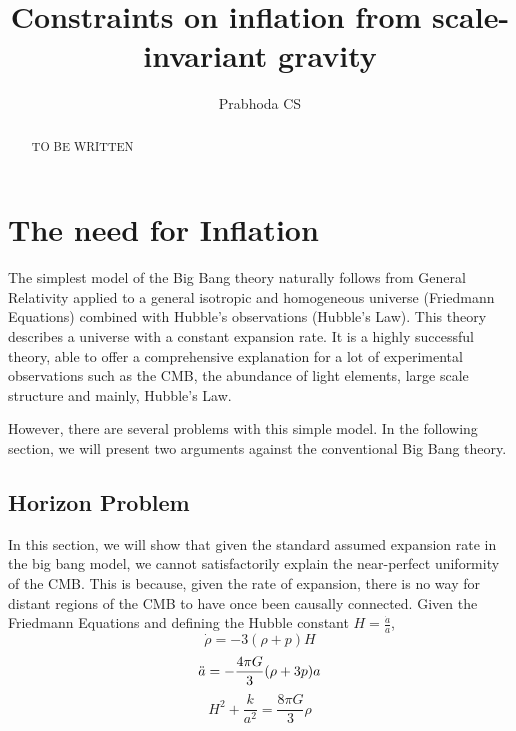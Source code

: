 \documentclass[aps,prd,reprint,preprintnumbers,showpacs,floatfix,nofootinbib,superscript address]{revtex4-2}
\begin{document}
\title{Constraints on inflation from scale-invariant gravity}

\author{Prabhoda CS}

\begin{abstract}

TO BE WRITTEN

\end{abstract}

\maketitle


\section{The need for Inflation}\label{The need for Inflation}

\indent The simplest model of the Big Bang theory naturally follows from General Relativity applied to a general isotropic and homogeneous universe (Friedmann Equations) combined with Hubble's observations (Hubble's Law). This theory describes a universe with a constant expansion rate. It is a highly successful theory, able to offer a comprehensive explanation for a lot of experimental observations such as the CMB, the abundance of light elements, large scale structure and mainly, Hubble's Law.

However, there are several problems with this simple model. In the following section, we will present two arguments against the conventional Big Bang theory.

\subsection{Horizon Problem}
In this section, we will show that given the standard assumed expansion rate in the big bang model, we cannot satisfactorily explain the near-perfect uniformity of the CMB. This is because, given the rate of expansion, there is no way for distant regions of the CMB to have once been causally connected.
Given the Friedmann Equations and defining the Hubble constant $H = \frac{\dot{a}}{a}$,
\begin{equation} \label{1}
    \dot{\rho} = -3(\rho + p)H
\end{equation}
\begin{equation} \label{2}
    \Ddot{a} = -\frac{4\pi G}{3} (\rho + 3p)a
\end{equation}
\begin{equation}    \label{3}
    H^2 + \frac{k}{a^2} = \frac{8 \pi G}{3} \rho
\end{equation}
\end{document}

